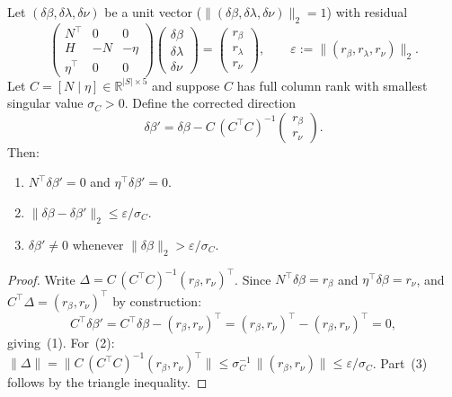 \begin{lemma}%
\label{lem:constraint-projection}
Let $(\delta\beta, \delta\lambda, \delta\nu)$ be a unit vector
($\|(\delta\beta, \delta\lambda, \delta\nu)\|_2 = 1$) with
residual
\[
  \begin{pmatrix}
    N^\top & 0 & 0 \\
    H & -N & -\eta \\
    \eta^\top & 0 & 0
  \end{pmatrix}
  \begin{pmatrix}\delta\beta\\\delta\lambda\\\delta\nu\end{pmatrix}
  = \begin{pmatrix}r_\beta\\r_\lambda\\r_\nu\end{pmatrix},
  \qquad
  \varepsilon
  := \bigl\|(r_\beta, r_\lambda, r_\nu)\bigr\|_2.
\]
Let $C = [N \mid \eta] \in \mathbb{R}^{|S| \times 5}$
and suppose $C$ has full column rank with smallest singular
value $\sigma_C > 0$.
Define the corrected direction
\[
  \delta\beta'
  = \delta\beta
    - C\,(C^\top C)^{-1}
      \begin{pmatrix}r_\beta \\ r_\nu\end{pmatrix}.
\]
Then:
\begin{enumerate}
\item $N^\top\delta\beta' = 0$ and
  $\eta^\top\delta\beta' = 0$.
\item $\|\delta\beta - \delta\beta'\|_2
  \leq \varepsilon / \sigma_C$.
\item $\delta\beta' \neq 0$ whenever
  $\|\delta\beta\|_2 > \varepsilon / \sigma_C$.
\end{enumerate}
\end{lemma}

\begin{proof}
Write $\Delta = C\,(C^\top C)^{-1}(r_\beta, r_\nu)^\top$.
Since $N^\top\delta\beta = r_\beta$ and
$\eta^\top\delta\beta = r_\nu$, and
$C^\top\Delta = (r_\beta, r_\nu)^\top$ by construction:
\[
  C^\top\delta\beta'
  = C^\top\delta\beta - (r_\beta, r_\nu)^\top
  = (r_\beta, r_\nu)^\top - (r_\beta, r_\nu)^\top = 0,
\]
giving~(1).
For~(2):
$\|\Delta\|
= \|C\,(C^\top C)^{-1}(r_\beta, r_\nu)^\top\|
\leq \sigma_C^{-1}\,\|(r_\beta, r_\nu)\|
\leq \varepsilon / \sigma_C$.
Part~(3) follows by the triangle inequality.
\end{proof}

